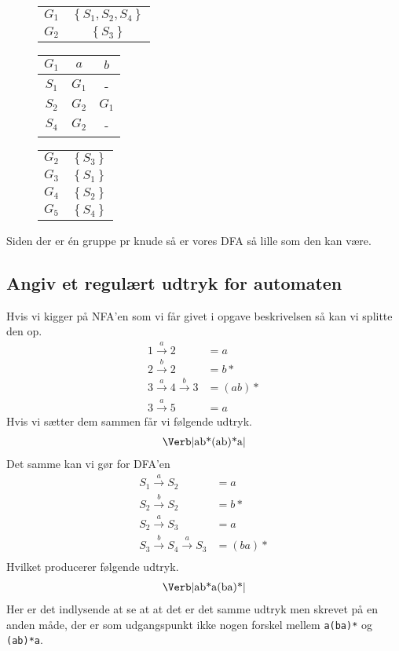 \documentclass[11pt,a4paper]{article}
\begin{document}
\begin{figure}[!ht]\label{fig:g1}
  \centering
  \begin{tabular}{c|c}
    $G_1$ & $\left\{S_1,S_2,S_4\right\}$\\
    $G_2$ & $\left\{S_3\right\}$
  \end{tabular}
\end{figure}
\begin{figure}[!ht]\label{fig:testg1}
  \centering
  \begin{tabular}{c|cc}
    $G_1$ & $a$ & $b$\\\hline
    $S_1$ & $G_1$ & - \\
    $S_2$ & $G_2$ & $G_1$ \\
    $S_4$ & $G_2$ & -
  \end{tabular}
\end{figure}
\begin{figure}[!ht]\label{fig:g1}
  \centering
  \begin{tabular}{c|c}
    $G_2$ & $\left\{S_3\right\}$\\
    $G_3$ & $\left\{S_1\right\}$\\
    $G_4$ & $\left\{S_2\right\}$\\
    $G_5$ & $\left\{S_4\right\}$\\
  \end{tabular}
\end{figure}
Siden der er én gruppe pr knude så er vores DFA så lille som den kan være.
\subsection{Angiv et regulært udtryk for automaten}
Hvis vi kigger på NFA'en som vi får givet i opgave beskrivelsen så kan vi splitte den op.
\begin{align*}
  1\xrightarrow{a}2 &= a\\
  2\xrightarrow{b}2 &= b*\\
  3\xrightarrow{a}4\xrightarrow{b}3 &= \left(ab\right)*\\
  3\xrightarrow{a}5 &= a
\end{align*}
Hvis vi sætter dem sammen får vi følgende udtryk.
\begin{align*}
  \text{\Verb|ab*(ab)*a|}
\end{align*}
Det samme kan vi gør for DFA'en
\begin{align*}
  S_1\xrightarrow{a}S_2 &= a\\
  S_2\xrightarrow{b}S_2 &= b*\\
  S_2\xrightarrow{a}S_3 &= a\\
  S_3\xrightarrow{b}S_4\xrightarrow{a}S_3 &= \left(ba\right)*\\
\end{align*}
Hvilket producerer følgende udtryk.
\begin{align*}
  \text{\Verb|ab*a(ba)*|}
\end{align*}
Her er det indlysende at se at at det er det samme udtryk men skrevet på en anden måde, der er som udgangspunkt ikke nogen forskel mellem \Verb|a(ba)*| og \Verb|(ab)*a|.
\end{document}
